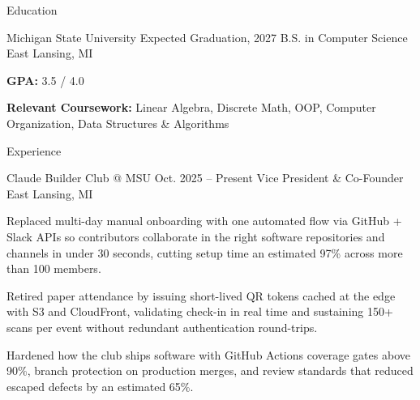 \documentclass[
	11pt
]{../../../resume}
\begin{document}
	\begin{rSection}{E}{ducation}
		\begin{rSectionEntry}
			{Michigan State University}
			{Expected Graduation, 2027}
			{B.S. in Computer Science}
			{}
			{East Lansing, MI}

			\item \textbf{GPA:} 3.5 / 4.0
			\item \textbf{Relevant Coursework:} Linear Algebra, Discrete Math, OOP, Computer Organization, Data Structures \& Algorithms
		\end{rSectionEntry}
	\end{rSection}

	\begin{rSection}{E}{xperience}
		\begin{rSectionEntry}
			{Claude Builder Club @ MSU}
			{Oct. 2025 -- Present}
			{Vice President \& Co-Founder}
			{}
			{East Lansing, MI}

			\item Replaced multi-day manual onboarding with one automated flow via GitHub + Slack APIs so contributors collaborate in the right software repositories and channels in under 30 seconds, cutting setup time an estimated 97\% across more than 100 members.
			\item Retired paper attendance by issuing short-lived QR tokens cached at the edge with S3 and CloudFront, validating check-in in real time and sustaining 150+ scans per event without redundant authentication round-trips.
			\item Hardened how the club ships software with GitHub Actions coverage gates above 90\%, branch protection on production merges, and review standards that reduced escaped defects by an estimated 65\%.
		\end{rSectionEntry}
	\end{rSection}
\end{document}
